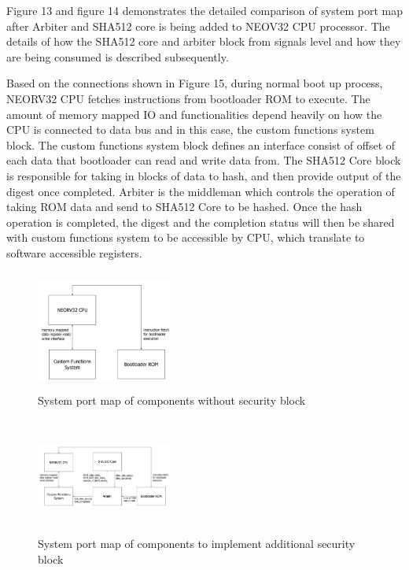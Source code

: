 \documentclass[a4paper,fleqn]{cas-dc}
\begin{document}
Figure 13 and figure 14 demonstrates the detailed comparison of system port map after Arbiter and SHA512 core is being added to NEOV32 CPU processor. The details of how the SHA512 core and arbiter block from signals level and how they are being consumed is described subsequently.

Based on the connections shown in Figure 15, during normal boot up process, NEORV32 CPU fetches instructions from bootloader ROM to execute. The amount of memory mapped IO and functionalities depend heavily on how the CPU is connected to data bus and in this case, the custom functions system block. The custom functions system block defines an interface consist of offset of each data that bootloader can read and write data from. The SHA512 Core block is responsible for taking in blocks of data to hash, and then provide output of the digest once completed. Arbiter is the middleman which controls the operation of taking ROM data and send to SHA512 Core to be hashed. Once the hash operation is completed, the digest and the completion status will then be shared with custom functions system to be accessible by CPU, which translate to software accessible registers.

\begin{figure}[hbt!]
	\centering
	\includegraphics[width=0.4\textwidth,height=1.55in]{figs/SystemPortMap-Original.JPG}
	\caption{System port map of components without security block}
\end{figure}

\begin{figure}[hbt!]
	\centering
	\includegraphics[width=0.4\textwidth,height=1.5in]{figs/SystemPortMap-Amended.JPG}
	\caption{System port map of components to implement additional security block}
\end{figure}
\end{document}
